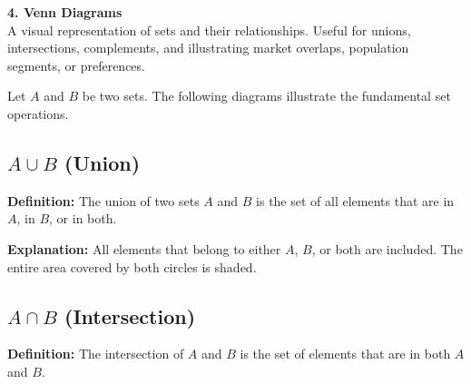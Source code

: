 \begin{tcolorbox}[sectionbox]
\textbf{4. Venn Diagrams}\\
A visual representation of sets and their relationships. Useful for unions, intersections, complements, and illustrating market overlaps, population segments, or preferences.

Let $A$ and $B$ be two sets. The following diagrams illustrate the fundamental set operations.  

\subsection*{$A \cup B$ (Union)}
\textbf{Definition:} The union of two sets $A$ and $B$ is the set of all elements that are in $A$, in $B$, or in both.  

\begin{center}
\end{center}

\textbf{Explanation:} All elements that belong to either $A$, $B$, or both are included. The entire area covered by both circles is shaded.

\subsection*{$A \cap B$ (Intersection)}
\textbf{Definition:} The intersection of $A$ and $B$ is the set of elements that are in both $A$ and $B$.  

\begin{center}
\end{center}
\end{tcolorbox}
